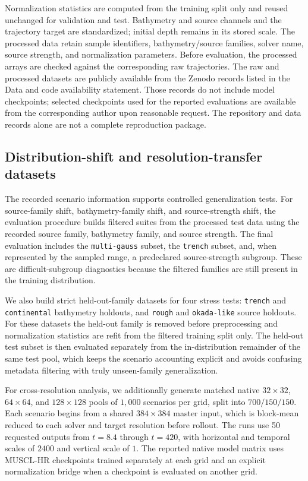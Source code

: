 Normalization statistics are computed from the training split only and reused unchanged for validation and test. Bathymetry and source channels and the trajectory target are standardized; initial depth remains in its stored scale. The processed data retain sample identifiers, bathymetry/source families, solver name, source strength, and normalization parameters. Before evaluation, the processed arrays are checked against the corresponding raw trajectories. The raw and processed datasets are publicly available from the Zenodo records listed in the Data and code availability statement. Those records do not include model checkpoints; selected checkpoints used for the reported evaluations are available from the corresponding author upon reasonable request. The repository and data records alone are not a complete reproduction package.

\subsection{Distribution-shift and resolution-transfer datasets}
\label{subsec:shift-resolution-data}

The recorded scenario information supports controlled generalization tests. For source-family shift, bathymetry-family shift, and source-strength shift, the evaluation procedure builds filtered suites from the processed test data using the recorded source family, bathymetry family, and source strength. The final evaluation includes the \texttt{multi-gauss} subset, the \texttt{trench} subset, and, when represented by the sampled range, a predeclared source-strength subgroup. These are difficult-subgroup diagnostics because the filtered families are still present in the training distribution.

We also build strict held-out-family datasets for four stress tests: \texttt{trench} and \texttt{continental} bathymetry holdouts, and \texttt{rough} and \texttt{okada-like} source holdouts. For these datasets the held-out family is removed before preprocessing and normalization statistics are refit from the filtered training split only. The held-out test subset is then evaluated separately from the in-distribution remainder of the same test pool, which keeps the scenario accounting explicit and avoids confusing metadata filtering with truly unseen-family generalization.

For cross-resolution analysis, we additionally generate matched native $32 \times 32$, $64 \times 64$, and $128 \times 128$ pools of $1{,}000$ scenarios per grid, split into $700/150/150$. Each scenario begins from a shared $384 \times 384$ master input, which is block-mean reduced to each solver and target resolution before rollout. The runs use 50 requested outputs from $t=8.4$ through $t=420$, with horizontal and temporal scales of $2400$ and vertical scale of $1$. The reported native model matrix uses MUSCL-HR checkpoints trained separately at each grid and an explicit normalization bridge when a checkpoint is evaluated on another grid.

